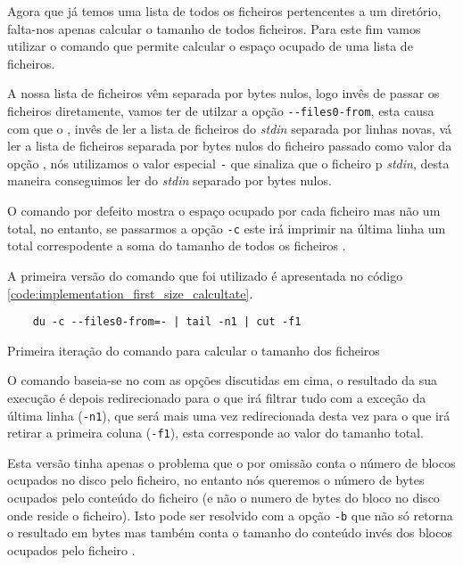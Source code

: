 Agora que já temos uma lista de todos os ficheiros pertencentes a um
diretório, falta-nos apenas calcular o tamanho de todos ficheiros.
Para este fim vamos utilizar o comando  que permite calcular o
espaço ocupado de uma lista de ficheiros.

A nossa lista de ficheiros vêm separada por bytes nulos, logo invês de passar os
ficheiros diretamente, vamos ter de utilzar a opção \Verb|--files0-from|, esta
causa com que o , invês de ler a lista de ficheiros do
\emph{stdin} separada por linhas novas, vá ler a lista de ficheiros separada por
bytes nulos do ficheiro passado como valor da opção \cite{du_man}, nós utilizamos
o valor especial \Verb|-| que sinaliza que o ficheiro p \emph{stdin}, desta
maneira conseguimos ler do \emph{stdin} separado por bytes nulos.

O comando  por defeito mostra o espaço ocupado por cada ficheiro
mas não um total, no entanto, se passarmos a opção \Verb|-c| este irá imprimir
na última linha um total correspodente a soma do tamanho de todos os ficheiros
\cite{du_man}.

A primeira versão do comando que foi utilizado é apresentada no código
\ref{code:implementation_first_size_calcultate}.

\begin{listing}[H]
	\centering
	\begin{verbatim}
    du -c --files0-from=- | tail -n1 | cut -f1
  \end{verbatim}
	\caption{Primeira iteração do comando para calcular o tamanho dos ficheiros}
	\label{code:implementation_first_size_calcultate}
\end{listing}

O comando baseia-se no  com as opções discutidas em cima, o
resultado da sua execução é depois redirecionado para o  que
irá filtrar tudo com a exceção da última linha (\Verb|-n1|), que será mais uma
vez redirecionada desta vez para o  que irá retirar a primeira
coluna (\Verb|-f1|), esta corresponde ao valor do tamanho total.

Esta versão tinha apenas o problema que o  por omissão conta o
número de blocos ocupados no disco pelo ficheiro, no entanto nós queremos o
número de bytes ocupados pelo conteúdo do ficheiro (e não o numero de bytes do
bloco no disco onde reside o ficheiro). Isto pode ser resolvido com a opção
\Verb|-b| que não só retorna o resultado em bytes mas também conta o tamanho do
conteúdo invés dos blocos ocupados pelo ficheiro \cite{du_man}.

